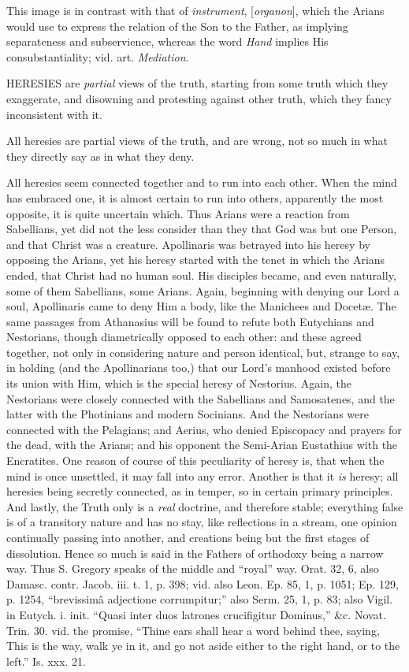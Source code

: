 This image is in contrast with that of \emph{instrument}, [\emph{organon}], which the Arians would use to express the relation of the Son
to the Father, as implying separateness and subservience, whereas the
word \emph{Hand} implies His
consubstantiality; vid. art. \emph{Mediation}.


HERESIES
are \emph{partial} views of the
truth, starting from some truth which they exaggerate, and disowning
and protesting against other truth, which they fancy inconsistent with
it.

All heresies are partial views of the truth, and
are wrong, not so much in what they directly say as in what they deny.

All heresies seem connected together and to run
into each other. When the mind has embraced one, it is almost certain
to run into others, apparently the most opposite, it is quite
uncertain which. Thus Arians were a reaction from Sabellians, yet did
not the less consider than they that God was but one Person, and that
Christ was a creature. Apollinaris was betrayed into his heresy by
opposing the Arians, yet his heresy started with the tenet in which
the Arians ended, that Christ had no human soul. His disciples became,
and even naturally, some of them Sabellians, some Arians. Again,
beginning with denying our Lord a soul, Apollinaris came to deny Him a
body, like the Manichees and Docetæ. The same passages from
Athanasius will be found to refute both Eutychians and Nestorians,
though diametrically opposed to each other: and these agreed together,
not only in considering nature and person identical, but, strange to say, in holding (and the Apollinarians too,) that our Lord's
manhood existed before its union with Him, which is the special heresy
of Nestorius. Again, the Nestorians were closely connected with the
Sabellians and Samosatenes, and the latter with the Photinians and
modern Socinians. And the Nestorians were connected with the Pelagians;
and Aerius, who denied Episcopacy and prayers for the dead, with the
Arians; and his opponent the Semi-Arian Eustathius with the Encratites.
One reason of course of this peculiarity of heresy is, that when the
mind is once unsettled, it may fall into any error. Another is that it
\emph{is} heresy; all heresies
being secretly connected, as in temper, so in certain primary
principles. And lastly, the Truth only is a \emph{real} doctrine, and therefore stable; everything false is of a
transitory nature and has no stay, like reflections in a stream, one
opinion continually passing into another, and creations being but the
first stages of dissolution. Hence so much is said in the Fathers of
orthodoxy being a narrow way. Thus S. Gregory speaks of the middle and
``royal'' way. Orat. 32, 6, also Damasc. contr. Jacob. iii. t. 1, p.
398; vid. also Leon. Ep. 85, 1, p. 1051; Ep. 129, p. 1254, ``brevissimâ
adjectione corrumpitur;'' also Serm. 25, 1, p. 83; also Vigil. in
Eutych. i. init. ``Quasi inter duos latrones crucifigitur Dominus,''
\&c. Novat. Trin. 30. vid. the promise, ``Thine ears shall hear a
word behind thee, saying, This is the way, walk ye in it, and go not
aside either to the right hand, or to the left.'' Is. xxx. 21.

